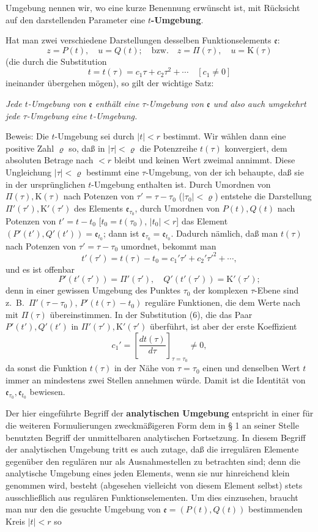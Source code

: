 \documentclass{article}
\begin{document}
Umgebung nennen wir, wo eine kurze Benennung erwünscht ist, mit Rücksicht auf den darstellenden Parameter eine \textbf{$t$-Umgebung}.

Hat man zwei verschiedene Darstellungen desselben Funktionselements $\mathfrak{e}$:
\[ z = P(t), \quad u = Q(t); \quad \text{bzw.} \quad z = \Pi(\tau), \quad u = \mathrm{K}(\tau) \]
(die durch die Substitution
\[ t = t(\tau) = c_1 \tau + c_2 \tau^2 + \cdots \quad [c_1 \neq 0] \]
ineinander übergehen mögen), so gilt der wichtige Satz:

\emph{Jede $t$-Umgebung von $\mathfrak{e}$ enthält eine $\tau$-Umgebung von $\mathfrak{e}$ und also auch umgekehrt jede $\tau$-Umgebung eine $t$-Umgebung.}

Beweis: Die $t$-Umgebung sei durch $|t| < r$ bestimmt. Wir wählen dann eine positive Zahl $\varrho$ so, daß in $|\tau| < \varrho$ die Potenzreihe $t(\tau)$ konvergiert, dem absoluten Betrage nach $< r$ bleibt und keinen Wert zweimal annimmt. Diese Ungleichung $|\tau| < \varrho$ bestimmt eine $\tau$-Umgebung, von der ich behaupte, daß sie in der ursprünglichen $t$-Umgebung enthalten ist. Durch Umordnen von $\Pi(\tau), \mathrm{K}(\tau)$ nach Potenzen von $\tau' = \tau - \tau_0$ ($|\tau_0| < \varrho$) entstehe die Darstellung $\Pi'(\tau'), \mathrm{K}'(\tau')$ des Elements $\mathfrak{e}_{\tau_0}$, durch Umordnen von $P(t), Q(t)$ nach Potenzen von $t' = t - t_0$ [$t_0 = t(\tau_0)$, $|t_0| < r$] das Element $(P'(t'), Q'(t')) = \mathfrak{e}_{t_0}$; dann ist $\mathfrak{e}_{\tau_0} = \mathfrak{e}_{t_0}$. Dadurch nämlich, daß man $t(\tau)$ nach Potenzen von $\tau' = \tau - \tau_0$ umordnet, bekommt man
\[ t'(\tau') = t(\tau) - t_0 = c_1' \tau' + c_2' \tau'^2 + \cdots, \tag{6} \]
und es ist offenbar
\[ P'(t'(\tau')) = \Pi'(\tau'), \quad Q'(t'(\tau')) = \mathrm{K}'(\tau'); \]
denn in einer gewissen Umgebung des Punktes $\tau_0$ der komplexen $\tau$-Ebene sind z.\ B.\ $\Pi'(\tau - \tau_0)$, $P'(t(\tau) - t_0)$ reguläre Funktionen, die dem Werte nach mit $\Pi(\tau)$ übereinstimmen. In der Substitution (6), die das Paar $P'(t'), Q'(t')$ in $\Pi'(\tau'), \mathrm{K}'(\tau')$ überführt, ist aber der erste Koeffizient
\[ c_1' = \left[ \frac{dt(\tau)}{d\tau} \right]_{\tau = \tau_0} \neq 0, \]
da sonst die Funktion $t(\tau)$ in der Nähe von $\tau = \tau_0$ einen und denselben Wert $t$ immer an mindestens zwei Stellen annehmen würde. Damit ist die Identität von $\mathfrak{e}_{\tau_0}, \mathfrak{e}_{t_0}$ bewiesen.

Der hier eingeführte Begriff der \textbf{analytischen Umgebung} entspricht in einer für die weiteren Formulierungen zweckmäßigeren Form dem in § 1 an seiner Stelle benutzten Begriff der unmittelbaren analytischen Fortsetzung. In diesem Begriff der analytischen Umgebung tritt es auch zutage, daß die irregulären Elemente gegenüber den regulären nur als Ausnahmestellen zu betrachten sind; denn die analytische Umgebung eines jeden Elements, wenn sie nur hinreichend klein genommen wird, besteht (abgesehen vielleicht von diesem Element selbst) stets ausschließlich aus regulären Funktionselementen. Um dies einzusehen, braucht man nur den die gesuchte Umgebung von $\mathfrak{e} = (P(t), Q(t))$ bestimmenden Kreis $|t| < r$ so
\end{document}
